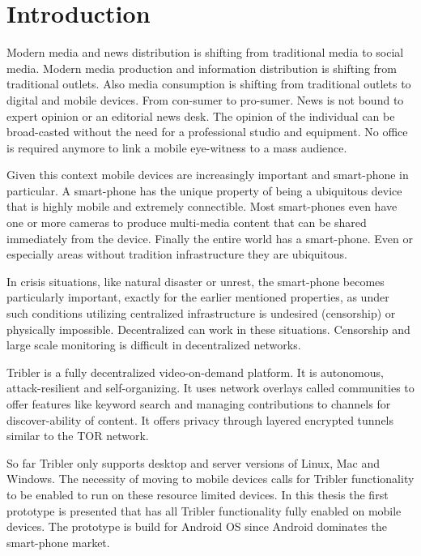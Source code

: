 \chapter{Introduction}
\label{ch:intro}

Modern media and news distribution is shifting from traditional media to social media.
Modern media production and information distribution is shifting from traditional outlets.
Also media consumption is shifting from traditional outlets to digital and mobile devices.
From con-sumer to pro-sumer.
News is not bound to expert opinion or an editorial news desk.
The opinion of the individual can be broad-casted without the need for a professional studio and equipment.
No office is required anymore to link a mobile eye-witness to a mass audience.

Given this context mobile devices are increasingly important and smart-phone in particular.
A smart-phone has the unique property of being a ubiquitous device that is highly mobile and extremely connectible.
Most smart-phones even have one or more cameras to produce multi-media content that can be shared immediately from the device.
Finally the entire world has a smart-phone.
Even or especially areas without tradition infrastructure they are ubiquitous.

In crisis situations, like natural disaster or unrest, the smart-phone becomes particularly important, exactly for the earlier mentioned properties, as under such conditions utilizing centralized infrastructure is undesired (censorship) or physically impossible.
Decentralized can work in these situations.
Censorship and large scale monitoring is difficult in decentralized networks.


Tribler is a fully decentralized video-on-demand platform. \cite{TriblerOverviewJournal, tribler2014play, tribler-anon-hd}
It is autonomous, attack-resilient and self-organizing. \cite{votecast, tribler-gossip}
It uses network overlays called communities to offer features like keyword search and managing contributions to channels for discover-ability of content.
It offers privacy through layered encrypted tunnels similar to the TOR network.\cite{triber2014at3, dingledine2004tor, dingledine2006design}

So far Tribler only supports desktop and server versions of Linux, Mac and Windows.
The necessity of moving to mobile devices calls for Tribler functionality to be enabled to run on these resource limited devices.
In this thesis the first prototype is presented that has all Tribler functionality fully enabled on mobile devices.
The prototype is build for Android OS since Android dominates the smart-phone market.



